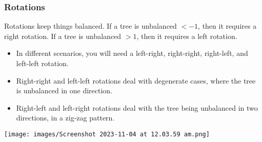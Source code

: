 \documentclass[14]{article}
\begin{document}
\subsubsection{Rotations}
Rotations keep things balanced. If a tree is unbalanced $<-1$, then it requires a right rotation.
If a tree is unbalanced $>1$, then it requires a left rotation.
\begin{itemize}
	\item In different scenarios, you will need a left-right, right-right, right-left, and left-left rotation.
	\item Right-right and left-left rotations deal with degenerate cases, where the tree is unbalanced in one direction.
	\item Right-left and left-right rotations deal with the tree being unbalanced in two directions, in a zig-zag pattern.
\end{itemize}
\begin{center}
\texttt{[image: images/Screenshot 2023-11-04 at 12.03.59 am.png]}
\end{center}
\end{document}
